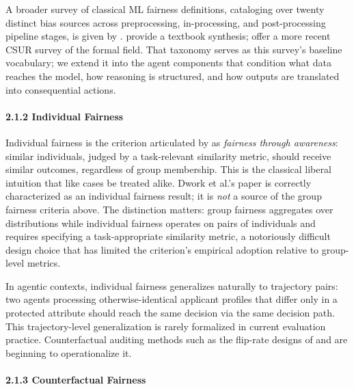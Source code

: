 \documentclass[10pt]{article}
\begin{document}
A broader survey of classical ML fairness definitions, cataloging over twenty distinct bias sources across preprocessing, in-processing, and post-processing pipeline stages, is given by \cite{mehrabi2021survey}. \cite{barocas2023fairness} provide a textbook synthesis; \cite{caton2024fairness} offer a more recent CSUR survey of the formal field. That taxonomy serves as this survey's baseline vocabulary; we extend it into the agent components that condition what data reaches the model, how reasoning is structured, and how outputs are translated into consequential actions.

\paragraph*{2.1.2 Individual Fairness}

Individual fairness is the criterion articulated by \cite{dwork2012fairness} as \emph{fairness through awareness}: similar individuals, judged by a task-relevant similarity metric, should receive similar outcomes, regardless of group membership. This is the classical liberal intuition that like cases be treated alike. Dwork et al.'s paper is correctly characterized as an individual fairness result; it is \emph{not} a source of the group fairness criteria above. The distinction matters: group fairness aggregates over distributions while individual fairness operates on pairs of individuals and requires specifying a task-appropriate similarity metric, a notoriously difficult design choice that has limited the criterion's empirical adoption relative to group-level metrics.

In agentic contexts, individual fairness generalizes naturally to trajectory pairs: two agents processing otherwise-identical applicant profiles that differ only in a protected attribute should reach the same decision via the same decision path. This trajectory-level generalization is rarely formalized in current evaluation practice. Counterfactual auditing methods such as the flip-rate designs of \cite{basu2026names} and \cite{mayilvaghanan2026counterfactual} are beginning to operationalize it.

\paragraph*{2.1.3 Counterfactual Fairness}
\end{document}
